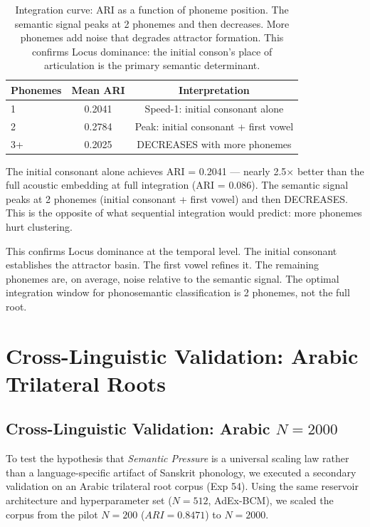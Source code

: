 \documentclass{article}
\begin{document}
\begin{table}[h]
\centering
\begin{tabular}{lcc}
\toprule
Phonemes & Mean ARI & Interpretation \\
\midrule
1 & 0.2041 & Speed-1: initial consonant alone \\
2 & 0.2784 & Peak: initial consonant + first vowel \\
3+ & 0.2025 & DECREASES with more phonemes \\
\bottomrule
\end{tabular}
\caption{Integration curve: ARI as a function of phoneme position. The semantic
signal peaks at 2 phonemes and then decreases. More phonemes add noise that
degrades attractor formation. This confirms Locus dominance: the initial
conson's place of articulation is the primary semantic determinant.}
\label{tab:integration}
\end{table}

The initial consonant alone achieves ARI = 0.2041 — nearly 2.5$\times$ better
than the full acoustic embedding at full integration (ARI = 0.086). The semantic
signal peaks at 2 phonemes (initial consonant + first vowel) and then DECREASES.
This is the opposite of what sequential integration would predict: more phonemes
hurt clustering.

This confirms Locus dominance at the temporal level. The initial consonant
establishes the attractor basin. The first vowel refines it. The remaining phonemes
are, on average, noise relative to the semantic signal. The optimal integration
window for phonosemantic classification is 2 phonemes, not the full root.

\section{Cross-Linguistic Validation: Arabic Trilateral Roots}

\subsection{Cross-Linguistic Validation: Arabic $N=2000$}
\label{sec:arabic_scaling}

To test the hypothesis that \textit{Semantic Pressure} is a universal scaling law rather than a language-specific artifact of Sanskrit phonology, we executed a secondary validation on an Arabic trilateral root corpus (Exp 54). Using the same reservoir architecture and hyperparameter set ($N=512$, AdEx-BCM), we scaled the corpus from the pilot $N=200$ ($ARI=0.8471$) to $N=2000$.
\end{document}
